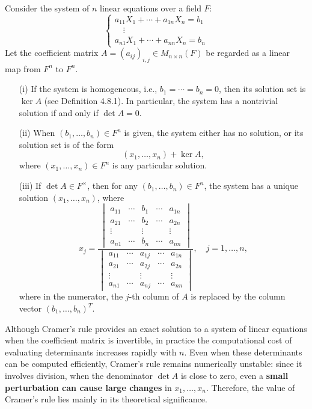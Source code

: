 \begin{corollary}
Consider the system of $n$ linear equations over a field $F$:
\[
\begin{cases}
a_{11} X_1 + \cdots + a_{1n} X_n = b_1 \\
\quad\vdots \\
a_{n1} X_1 + \cdots + a_{nn} X_n = b_n
\end{cases}
\]
Let the coefficient matrix $A = (a_{ij})_{i,j} \in M_{n \times n}(F)$ be regarded as a linear map from $F^n$ to $F^n$.
\begin{itemize}
    \item[(i)] If the system is homogeneous, i.e., $b_1 = \cdots = b_n = 0$, then its solution set is $\ker A$ (see Definition 4.8.1). In particular, the system has a nontrivial solution if and only if $\det A = 0$.
    \item[(ii)] When $(b_1, \ldots, b_n) \in F^n$ is given, the system either has no solution, or its solution set is of the form
    \[
    (x_1, \ldots, x_n) + \ker A,
    \]
    where $(x_1, \ldots, x_n) \in F^n$ is any particular solution.
    \item[(iii)] If $\det A \in F^\times$, then for any $(b_1, \ldots, b_n) \in F^n$, the system has a unique solution $(x_1, \ldots, x_n)$, where
    \[
    x_j = \frac{
    \begin{vmatrix}
    a_{11} & \cdots & b_1 & \cdots & a_{1n} \\
    a_{21} & \cdots & b_2 & \cdots & a_{2n} \\
    \vdots &        & \vdots &        & \vdots \\
    a_{n1} & \cdots & b_n & \cdots & a_{nn}
    \end{vmatrix}
    }{
    \begin{vmatrix}
    a_{11} & \cdots & a_{1j} & \cdots & a_{1n} \\
    a_{21} & \cdots & a_{2j} & \cdots & a_{2n} \\
    \vdots &        & \vdots &        & \vdots \\
    a_{n1} & \cdots & a_{nj} & \cdots & a_{nn}
    \end{vmatrix}
    }, \quad j = 1, \ldots, n,
    \]
    where in the numerator, the $j$-th column of $A$ is replaced by the column vector $(b_1, \ldots, b_n)^T$.
\end{itemize}
\end{corollary}

\begin{note}
Although Cramer's rule provides an exact solution to a system of linear equations when the coefficient matrix is invertible, in practice the computational cost of evaluating determinants increases rapidly with $n$. Even when these determinants can be computed efficiently, Cramer's rule remains numerically unstable: since it involves division, when the denominator $\det A$ is close to zero, even a \textbf{small perturbation can cause large changes} in $x_1, \ldots, x_n$. Therefore, the value of Cramer's rule lies mainly in its theoretical significance.
\end{note}

